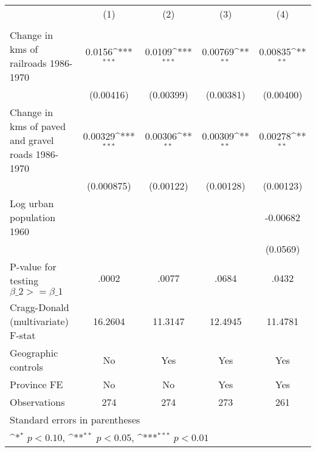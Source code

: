{
\def\sym#1{\ifmmode^{#1}\else\(^{#1}\)\fi}
\begin{tabular}{l*{4}{c}}
\hline\hline
                &\multicolumn{1}{c}{(1)}&\multicolumn{1}{c}{(2)}&\multicolumn{1}{c}{(3)}&\multicolumn{1}{c}{(4)}\\
                &\multicolumn{1}{c}{}&\multicolumn{1}{c}{}&\multicolumn{1}{c}{}&\multicolumn{1}{c}{}\\
\hline
Change in kms of railroads 1986-1970&   0.0156\sym{***}&   0.0109\sym{***}&  0.00769\sym{**} &  0.00835\sym{**} \\
                &(0.00416)         &(0.00399)         &(0.00381)         &(0.00400)         \\
[1em]
Change in kms of paved and gravel roads 1986-1970&  0.00329\sym{***}&  0.00306\sym{**} &  0.00309\sym{**} &  0.00278\sym{**} \\
                &(0.000875)         &(0.00122)         &(0.00128)         &(0.00123)         \\
[1em]
Log urban population 1960&                  &                  &                  & -0.00682         \\
                &                  &                  &                  & (0.0569)         \\
\hline
P-value for testing $\beta\_{2} >= \beta\_{1}$&    .0002         &    .0077         &    .0684         &    .0432         \\
Cragg-Donald (multivariate) F-stat&  16.2604         &  11.3147         &  12.4945         &  11.4781         \\
Geographic controls&       No         &      Yes         &      Yes         &      Yes         \\
Province FE     &       No         &       No         &      Yes         &      Yes         \\
Observations    &      274         &      274         &      273         &      261         \\
\hline\hline
\multicolumn{5}{l}{\footnotesize Standard errors in parentheses}\\
\multicolumn{5}{l}{\footnotesize \sym{*} \(p<0.10\), \sym{**} \(p<0.05\), \sym{***} \(p<0.01\)}\\
\end{tabular}
}
